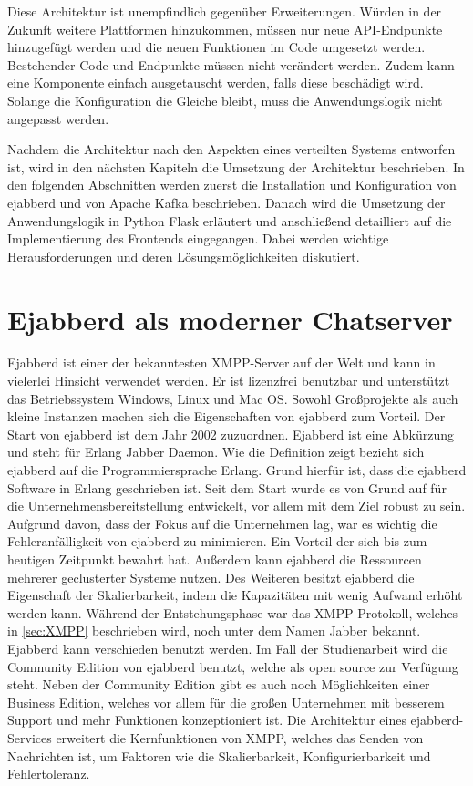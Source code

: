 \documentclass[a4paper,titlepage,halfparskip,12pt]{scrreprt}
\begin{document}
\begin{onehalfspacing}
Diese Architektur ist unempfindlich gegenüber Erweiterungen. Würden in der Zukunft weitere Plattformen hinzukommen, müssen nur neue \acs{API}-Endpunkte hinzugefügt werden und die neuen Funktionen im Code umgesetzt werden. Bestehender Code und Endpunkte müssen nicht verändert werden. Zudem kann eine Komponente einfach ausgetauscht werden, falls diese beschädigt wird. Solange die Konfiguration die Gleiche bleibt, muss die Anwendungslogik nicht angepasst werden.

Nachdem die Architektur nach den Aspekten eines verteilten Systems entworfen ist, wird in den nächsten Kapiteln die Umsetzung der Architektur beschrieben. In den folgenden Abschnitten werden zuerst die Installation und Konfiguration von ejabberd und von Apache Kafka beschrieben. Danach wird die Umsetzung der Anwendungslogik in Python Flask erläutert und anschließend detailliert auf die Implementierung des Frontends eingegangen. Dabei werden wichtige Herausforderungen und deren Lösungsmöglichkeiten diskutiert.

\pagebreak

\section{Ejabberd als moderner Chatserver}
\label{sec:ejabberd}

Ejabberd ist einer der bekanntesten \ac{XMPP}-Server auf der Welt und kann in vielerlei Hinsicht verwendet werden. Er ist lizenzfrei benutzbar und unterstützt das Betriebssystem Windows, Linux und Mac OS. Sowohl Großprojekte als auch kleine Instanzen machen sich die Eigenschaften von ejabberd zum Vorteil. Der Start von ejabberd ist dem Jahr 2002 zuzuordnen. Ejabberd ist eine Abkürzung und steht für \glqq Erlang Jabber Daemon\grqq. Wie die Definition zeigt bezieht sich ejabberd auf die Programmiersprache Erlang. Grund hierfür ist, dass die ejabberd Software in Erlang geschrieben ist. Seit dem Start wurde es von Grund auf für die Unternehmensbereitstellung entwickelt, vor allem mit dem Ziel robust zu sein. Aufgrund davon, dass der Fokus auf die Unternehmen lag, war es wichtig die Fehleranfälligkeit von ejabberd zu minimieren. Ein Vorteil der sich bis zum heutigen Zeitpunkt bewahrt hat. Außerdem kann ejabberd die Ressourcen mehrerer geclusterter Systeme nutzen. Des Weiteren besitzt ejabberd die Eigenschaft der Skalierbarkeit, indem die Kapazitäten mit wenig Aufwand erhöht werden kann. Während der Entstehungsphase war das \ac{XMPP}-Protokoll, welches in \autoref{sec:XMPP} beschrieben wird, noch unter dem Namen Jabber bekannt. Ejabberd kann verschieden benutzt werden. Im Fall der Studienarbeit wird die Community Edition von ejabberd benutzt, welche als open source zur Verfügung steht. Neben der Community Edition gibt es auch noch Möglichkeiten einer Business Edition, welches vor allem für die großen Unternehmen mit besserem Support und mehr Funktionen konzeptioniert ist. Die Architektur eines ejabberd-Services erweitert die Kernfunktionen von \ac{XMPP}, welches das Senden von Nachrichten ist, um Faktoren wie die Skalierbarkeit, Konfigurierbarkeit und Fehlertoleranz.


\end{onehalfspacing}
\end{document}
